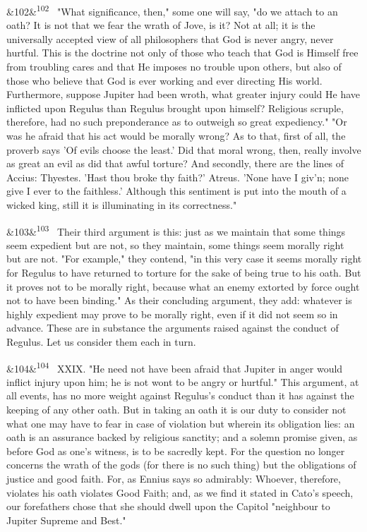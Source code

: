 \documentclass[12pt]{article}
\newcommand{\para}[1][]{\par\noindent\ifx&#1&\else\textsuperscript{\footnotesize #1}~\fi}
\begin{document}
\para[102] "What significance, then," some one will say, "do we attach to an oath? It is not that we fear the wrath of Jove, is it? Not at all; it is the universally accepted view of all philosophers that God is never angry, never hurtful. This is the doctrine not only of those who teach that God is Himself free from troubling cares and that He imposes no trouble upon others, but also of those who believe that God is ever working and ever directing His world. Furthermore, suppose Jupiter had been wroth, what greater injury could He have inflicted upon Regulus than Regulus brought upon himself? Religious scruple, therefore, had no such preponderance as to outweigh so great expediency." "Or was he afraid that his act would be morally wrong? As to that, first of all, the proverb says 'Of evils choose the least.' Did that moral wrong, then, really involve as great an evil as did that awful torture? And secondly, there are the lines of Accius: Thyestes. 'Hast thou broke thy faith?' Atreus. 'None have I giv'n; none give I ever to the faithless.' Although this sentiment is put into the mouth of a wicked king, still it is illuminating in its correctness."

\para[103] Their third argument is this: just as we maintain that some things seem expedient but are not, so they maintain, some things seem morally right but are not. "For example," they contend, "in this very case it seems morally right for Regulus to have returned to torture for the sake of being true to his oath. But it proves not to be morally right, because what an enemy extorted by force ought not to have been binding." As their concluding argument, they add: whatever is highly expedient may prove to be morally right, even if it did not seem so in advance. These are in substance the arguments raised against the conduct of Regulus. Let us consider them each in turn.

\para[104] XXIX. "He need not have been afraid that Jupiter in anger would inflict injury upon him; he is not wont to be angry or hurtful." This argument, at all events, has no more weight against Regulus's conduct than it has against the keeping of any other oath. But in taking an oath it is our duty to consider not what one may have to fear in case of violation but wherein its obligation lies: an oath is an assurance backed by religious sanctity; and a solemn promise given, as before God as one's witness, is to be sacredly kept. For the question no longer concerns the wrath of the gods (for there is no such thing) but the obligations of justice and good faith. For, as Ennius says so admirably: Whoever, therefore, violates his oath violates Good Faith; and, as we find it stated in Cato's speech, our forefathers chose that she should dwell upon the Capitol "neighbour to Jupiter Supreme and Best."
\end{document}

